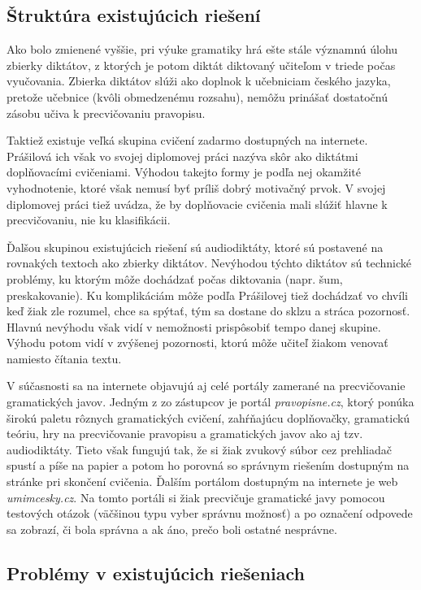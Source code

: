 \documentclass[12pt,oneside]{fithesis2}
\begin{document}
       		\subsection{Štruktúra existujúcich riešení}
       				\par Ako bolo zmienené vyššie, pri výuke gramatiky hrá ešte stále významnú úlohu zbierky diktátov, z ktorých je potom diktát diktovaný učiteľom v triede počas vyučovania. Zbierka diktátov slúži ako doplnok k učebniciam českého jazyka, pretože učebnice (kvôli obmedzenému rozsahu), nemôžu prinášať dostatočnú zásobu učiva k precvičovaniu pravopisu.
       				\par Taktiež existuje veľká skupina cvičení zadarmo dostupných na internete. Prášilová\cite{prasilova14} ich však vo svojej diplomovej práci nazýva skôr ako diktátmi doplňovacími cvičeniami. Výhodou takejto formy je podľa nej okamžité vyhodnotenie, ktoré však nemusí byť príliš dobrý motivačný prvok. V svojej diplomovej práci tiež uvádza, že by doplňovacie cvičenia mali slúžiť hlavne k precvičovaniu, nie ku klasifikácii.
       				\par Ďalšou skupinou existujúcich riešení sú audiodiktáty, ktoré sú postavené na rovnakých textoch ako zbierky diktátov. Nevýhodou týchto diktátov sú technické problémy, ku ktorým môže dochádzať počas diktovania (napr. šum, preskakovanie). Ku komplikáciám môže podľa Prášilovej tiež dochádzať vo chvíli keď žiak zle rozumel, chce sa spýtať, tým sa dostane do sklzu a stráca pozornosť. Hlavnú nevýhodu však vidí v nemožnosti prispôsobiť tempo danej skupine. Výhodu potom vidí v zvýšenej pozornosti, ktorú môže učiteľ žiakom venovať namiesto čítania textu.
		\par V súčasnosti sa na internete objavujú aj celé portály zamerané na precvičovanie gramatických javov. Jedným z zo zástupcov je portál \textit{pravopisne.cz}, ktorý ponúka širokú paletu rôznych gramatických cvičení, zahŕňajúcu doplňovačky, gramatickú teóriu, hry na precvičovanie pravopisu a gramatických javov ako aj tzv. audiodiktáty. Tieto však fungujú tak, že si žiak zvukový súbor cez prehliadač spustí a píše na papier a potom ho porovná so správnym riešením dostupným na stránke pri skončení cvičenia. Ďalším portálom dostupným na internete je web \textit{umimcesky.cz}. Na tomto portáli si žiak precvičuje gramatické javy pomocou testových otázok (väčšinou typu vyber správnu možnosť) a po označení odpovede sa zobrazí, či bola správna a ak áno, prečo boli ostatné nesprávne.
		
       		\subsection{Problémy v existujúcich riešeniach}
\end{document}
